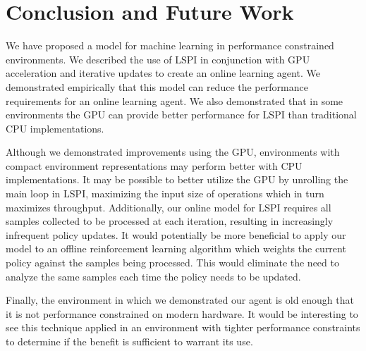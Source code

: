 \chapter{Conclusion and Future Work}
\label{chap:conclusion}

We have proposed a model for machine learning in performance constrained environments. We described the use of LSPI in conjunction with GPU acceleration and iterative updates to create an online learning agent. We demonstrated empirically that this model can reduce the performance requirements for an online learning agent. We also demonstrated that in some environments the GPU can provide better performance for LSPI than traditional CPU implementations.

Although we demonstrated improvements using the GPU, environments with compact environment representations may perform better with CPU implementations. It may be possible to better utilize the GPU by unrolling the main loop in LSPI, maximizing the input size of operations which in turn maximizes throughput. Additionally, our online model for LSPI requires all samples collected to be processed at each iteration, resulting in increasingly infrequent policy updates. It would potentially be more beneficial to apply our model to an offline reinforcement learning algorithm which weights the current policy against the samples being processed. This would eliminate the need to analyze the same samples each time the policy needs to be updated.

Finally, the environment in which we demonstrated our agent is old enough that it is not performance constrained on modern hardware. It would be interesting to see this technique applied in an environment with tighter performance constraints to determine if the benefit is sufficient to warrant its use.